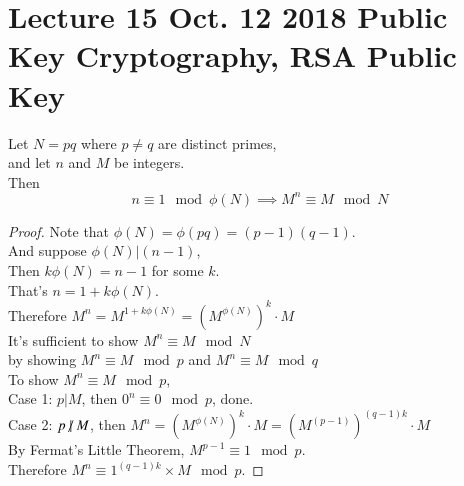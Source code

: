 \documentclass[11pt]{article}
\begin{document}
	\section{Lecture 15 Oct. 12 2018 Public Key Cryptography, RSA Public Key}
		\begin{lemma}
			Let $N = pq$ where $p \neq q$ are distinct primes, \\
			and let $n$ and $M$ be integers. \\
			Then 
			\[
				n \equiv 1 \mod \phi(N) \implies M^n \equiv M \mod N
			\]
		\end{lemma}
		\begin{proof}
			Note that $\phi(N) = \phi(pq) = (p-1)(q-1)$. \\
			And suppose $\phi(N) | (n-1)$, \\
			Then $k \phi(N) = n - 1$ for some $k$. \\
			That's $n = 1 + k \phi(N)$. \\
			Therefore $M^n = M^{1 + k \phi(N)} = (M^{\phi(N)})^k \cdot M $ \\
			It's sufficient to show $M^n \equiv M \mod N$\\
			by showing $M^n \equiv M \mod p$ and $M^n \equiv M \mod q$ \\
			To show $M^n \equiv M \mod p$, \\
			Case 1: $p | M$, then $0^n \equiv 0 \mod p$, done. \\
			Case 2: $p \centernot | M$, then $M^n = (M^{\phi(N)})^k \cdot M = (M^{(p-1)})^{(q-1)k} \cdot M$ \\
			By Fermat's Little Theorem, $M^{p-1} \equiv 1 \mod p$. \\
			Therefore $M^n \equiv 1^{(q-1)k} \times M \mod p$.
		\end{proof}
		
\end{document}
